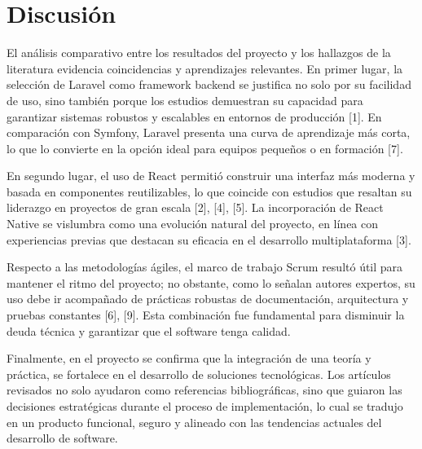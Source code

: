 \section{Discusión}
El análisis comparativo entre los resultados del proyecto y los hallazgos de la literatura 
evidencia coincidencias y aprendizajes relevantes. En primer lugar, la selección de 
Laravel como framework backend se justifica no solo por su facilidad de uso, sino 
también porque los estudios demuestran su capacidad para garantizar sistemas robustos y 
escalables en entornos de producción [1]. En comparación con Symfony, Laravel 
presenta una curva de aprendizaje más corta, lo que lo convierte en la opción ideal para 
equipos pequeños o en formación [7]. 

En segundo lugar, el uso de React permitió construir una interfaz más moderna y basada 
en componentes reutilizables, lo que coincide con estudios que resaltan su liderazgo en 
proyectos de gran escala [2], [4], [5]. La incorporación de React Native se vislumbra 
como una evolución natural del proyecto, en línea con experiencias previas que destacan 
su eficacia en el desarrollo multiplataforma [3]. 

Respecto a las metodologías ágiles, el marco de trabajo Scrum resultó útil para mantener 
el ritmo del proyecto; no obstante, como lo señalan autores expertos, su uso debe ir 
acompañado de prácticas robustas de documentación, arquitectura y pruebas constantes 
[6], [9]. Esta combinación fue fundamental para disminuir la deuda técnica y garantizar 
que el software tenga calidad. 

Finalmente, en el proyecto se confirma que la integración de una teoría y práctica, se  
fortalece en el desarrollo de soluciones tecnológicas. Los artículos revisados no solo 
ayudaron como referencias bibliográficas, sino que guiaron las decisiones estratégicas 
durante el proceso de implementación, lo cual se tradujo en un producto funcional, 
seguro y alineado con las tendencias actuales del desarrollo de software. 